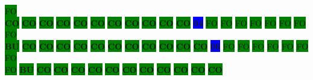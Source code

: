 \colorbox{green}{\color[gray]{0.75}FO}%
\\
\colorbox{green}{\color[rgb]{0,0,0}\textbf{CO}}%
\colorbox{green}{\color[rgb]{0,0,0}\textbf{CO}}%
\colorbox{green}{\color[rgb]{0,0,0}\textbf{CO}}%
\colorbox{green}{\color[rgb]{0,0,0}\textbf{CO}}%
\colorbox{green}{\color[rgb]{0,0,0}\textbf{CO}}%
\colorbox{green}{\color[rgb]{0,0,0}\textbf{CO}}%
\colorbox{green}{\color[rgb]{0,0,0}\textbf{CO}}%
\colorbox{green}{\color[rgb]{0,0,0}\textbf{CO}}%
\colorbox{green}{\color[rgb]{0,0,0}\textbf{CO}}%
\colorbox{green}{\color[rgb]{0,0,0}\textbf{CO}}%
\colorbox{green}{\color[rgb]{0,0,0}\textbf{CO}}%
\colorbox{blue}{\color[rgb]{1,0,0}\textbf{04}}%
\colorbox{green}{\color[gray]{0.75}FO}%
\colorbox{green}{\color[gray]{0.75}FO}%
\colorbox{green}{\color[gray]{0.75}FO}%
\colorbox{green}{\color[gray]{0.75}FO}%
\colorbox{green}{\color[gray]{0.75}FO}%
\colorbox{green}{\color[gray]{0.75}FO}%
\colorbox{green}{\color[gray]{0.75}FO}%
\colorbox{green}{\color[gray]{0.75}FO}%
\\
\colorbox{green}{\color[rgb]{1,0,0}\textbf{BU}}%
\colorbox{green}{\color[rgb]{0,0,0}\textbf{CO}}%
\colorbox{green}{\color[rgb]{0,0,0}\textbf{CO}}%
\colorbox{green}{\color[rgb]{0,0,0}\textbf{CO}}%
\colorbox{green}{\color[rgb]{0,0,0}\textbf{CO}}%
\colorbox{green}{\color[rgb]{0,0,0}\textbf{CO}}%
\colorbox{green}{\color[rgb]{0,0,0}\textbf{CO}}%
\colorbox{green}{\color[rgb]{0,0,0}\textbf{CO}}%
\colorbox{green}{\color[rgb]{0,0,0}\textbf{CO}}%
\colorbox{green}{\color[rgb]{0,0,0}\textbf{CO}}%
\colorbox{green}{\color[rgb]{0,0,0}\textbf{CO}}%
\colorbox{green}{\color[rgb]{0,0,0}\textbf{CO}}%
\colorbox{blue}{\color[rgb]{1,0,0}\textbf{06}}%
\colorbox{green}{\color[gray]{0.75}FO}%
\colorbox{green}{\color[gray]{0.75}FO}%
\colorbox{green}{\color[gray]{0.75}FO}%
\colorbox{green}{\color[gray]{0.75}FO}%
\colorbox{green}{\color[gray]{0.75}FO}%
\colorbox{green}{\color[gray]{0.75}FO}%
\colorbox{green}{\color[gray]{0.75}FO}%
\\
\colorbox{green}{\color[gray]{0.75}FO}%
\colorbox{green}{\color[rgb]{1,0,0}\textbf{BU}}%
\colorbox{green}{\color[rgb]{0,0,0}\textbf{CO}}%
\colorbox{green}{\color[rgb]{0,0,0}\textbf{CO}}%
\colorbox{green}{\color[rgb]{0,0,0}\textbf{CO}}%
\colorbox{green}{\color[rgb]{0,0,0}\textbf{CO}}%
\colorbox{green}{\color[rgb]{0,0,0}\textbf{CO}}%
\colorbox{green}{\color[rgb]{0,0,0}\textbf{CO}}%
\colorbox{green}{\color[rgb]{0,0,0}\textbf{CO}}%
\colorbox{green}{\color[rgb]{0,0,0}\textbf{CO}}%
\colorbox{green}{\color[rgb]{0,0,0}\textbf{CO}}%
\colorbox{green}{\color[rgb]{0,0,0}\textbf{CO}}%
\colorbox{green}{\color[rgb]{0,0,0}\textbf{CO}}%
